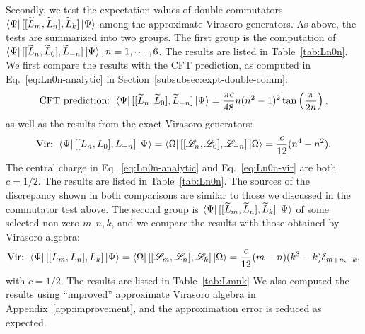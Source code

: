 \documentclass[12pt, nofootinbib]{article}
\theoremstyle{plain}
\theoremstyle{assumption}
\theoremstyle{definition}
\theoremstyle{plain}
\theoremstyle{plain}
\theoremstyle{plain}
\theoremstyle{plain}
\theoremstyle{plain}
\def\Leff{\widetilde{L}}
\def\Lcft{\mathscr{L}}
\begin{document}
Secondly, we test the expectation values of double commutators $\bra{\Psi} [[\Leff_m,\Leff_n],\Leff_k]\ket{\Psi}$ among the approximate Virasoro generators. As above, the tests are summarized into two groups. The first group is the computation of $\bra{\Psi} [[\Leff_n,\Leff_0],\Leff_{-n}]\ket{\Psi}, n=1,\cdots,6$. The results are listed in Table~\ref{tab:Ln0n}. We first compare the results with the CFT prediction, as computed in Eq.~\eqref{eq:Ln0n-analytic} in Section~\ref{subsubsec:expt-double-comm}:
\begin{equation}\label{eq:Ln0n-cft-num}
    \text{CFT prediction: } \bra{\Psi} [[\Leff_n,\Leff_0],\Leff_{-n}]\ket{\Psi} =  \frac{\pi c}{48} n (n^2-1)^2 \tan\left( \frac{\pi}{2n} \right),
\end{equation}
as well as the results from the exact Virasoro generators: 
\begin{equation}\label{eq:Ln0n-vir}
    \text{Vir: } \bra{\Psi} [[L_n,L_0],L_{-n}]\ket{\Psi} = \bra{\Omega} [[\Lcft_n,\Lcft_0],\Lcft_{-n}]\ket{\Omega} = \frac{c}{12}(n^4-n^2). 
\end{equation}
The central charge in Eq.~\eqref{eq:Ln0n-analytic} and Eq.~\eqref{eq:Ln0n-vir} are both $c=1/2$. The results are listed in Table~\ref{tab:Ln0n}. The sources of the discrepancy shown in both comparisons are similar to those we discussed in the commutator test above. 
The second group is $\bra{\Psi} [[\Leff_m,\Leff_n],\Leff_k]\ket{\Psi}$ of some selected non-zero $m,n,k$, and we compare the results with those obtained by Virasoro algebra:
\begin{equation}
    \text{Vir: }\bra{\Psi} [[L_m,L_n],L_k]\ket{\Psi} = \bra{\Omega} [[\Lcft_m,\Lcft_n],\Lcft_k]\ket{\Omega} = \frac{c}{12}(m-n)(k^3-k)\delta_{m+n,-k},
\end{equation}
with $c = 1/2$. The results are listed in Table~\ref{tab:Lmnk}
We also computed the results using ``improved'' approximate Virasoro algebra in Appendix~\ref{app:improvement}, and the approximation error is reduced as expected. 
\end{document}
